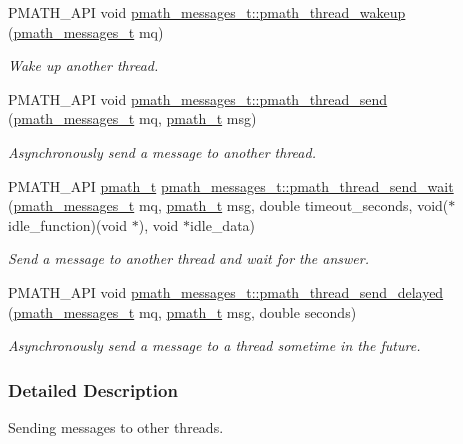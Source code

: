 \begin{CompactItemize}
PMATH\_\-API void \hyperlink{group__threadmsg_gbf90d49f5c42ccaa736ae5e56af6a4a6}{pmath\_\-messages\_\-t::pmath\_\-thread\_\-wakeup} (\hyperlink{classpmath__messages__t}{pmath\_\-messages\_\-t} mq)
\begin{CompactList}\small\item\em Wake up another thread. \item\end{CompactList}\item 
PMATH\_\-API void \hyperlink{group__threadmsg_ga3867a708fb07b86e017e8f201ef7edd}{pmath\_\-messages\_\-t::pmath\_\-thread\_\-send} (\hyperlink{classpmath__messages__t}{pmath\_\-messages\_\-t} mq, \hyperlink{classpmath__t}{pmath\_\-t} msg)
\begin{CompactList}\small\item\em Asynchronously send a message to another thread. \item\end{CompactList}\item 
PMATH\_\-API \hyperlink{classpmath__t}{pmath\_\-t} \hyperlink{group__threadmsg_g4ce8afcfec001a88441bdf8b50bcd157}{pmath\_\-messages\_\-t::pmath\_\-thread\_\-send\_\-wait} (\hyperlink{classpmath__messages__t}{pmath\_\-messages\_\-t} mq, \hyperlink{classpmath__t}{pmath\_\-t} msg, double timeout\_\-seconds, void($\ast$idle\_\-function)(void $\ast$), void $\ast$idle\_\-data)
\begin{CompactList}\small\item\em Send a message to another thread and wait for the answer. \item\end{CompactList}\item 
PMATH\_\-API void \hyperlink{group__threadmsg_g75339d9dd1902293cb72b38e77caa742}{pmath\_\-messages\_\-t::pmath\_\-thread\_\-send\_\-delayed} (\hyperlink{classpmath__messages__t}{pmath\_\-messages\_\-t} mq, \hyperlink{classpmath__t}{pmath\_\-t} msg, double seconds)
\begin{CompactList}\small\item\em Asynchronously send a message to a thread sometime in the future. \item\end{CompactList}\end{CompactItemize}


\subsubsection{Detailed Description}
Sending messages to other threads. 

